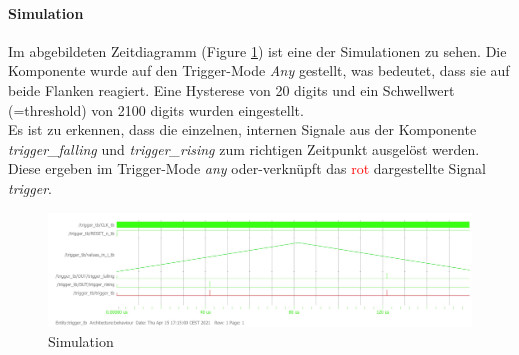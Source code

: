 \paragraph{Simulation}
Im abgebildeten Zeitdiagramm (Figure \ref{TriggerSim}) ist eine der Simulationen zu sehen. Die Komponente wurde auf den Trigger-Mode \textit{Any} gestellt, was bedeutet, dass sie auf beide Flanken reagiert. Eine Hysterese von 20 digits und ein Schwellwert (=threshold) von 2100 digits wurden eingestellt.\\Es ist zu erkennen, dass die einzelnen, internen Signale aus der Komponente \textit{trigger\_falling} und \textit{trigger\_rising} zum richtigen Zeitpunkt ausgelöst werden. Diese ergeben im Trigger-Mode \textit{any} oder-verknüpft das \textcolor{red}{rot} dargestellte Signal \textit{trigger}. 
\begin{figure}[h]
	\begin{center}
		\includegraphics[width=16cm]{SAUER/Grafiken/Trigger/Simulation.jpg}
		\caption{Simulation}
		\label{TriggerSim}
	\end{center}
\end{figure}